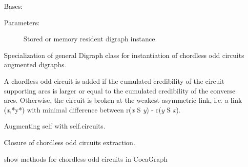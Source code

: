 \documentclass[letterpaper,10pt,english]{sphinxmanual}
\begin{document}
\begin{fulllineitems}
\label{techDoc:digraphs.CocaDigraph}
Bases: {\hyperref[techDoc:digraphs.Digraph]{\emph{}}}
\begin{description}
\item[{Parameters:}] \leavevmode
Stored or memory resident digraph instance.

\end{description}

Specialization of general Digraph class for instantiation
of chordless odd circuits augmented digraphs.

A chordless odd circuit is added if the cumulated credibility of the circuit supporting arcs is larger or
equal to the cumulated credibility of the converse arcs. Otherwise, the circuit is broken at the weakest asymmetric link,
i.e. a link (\emph{x},*y*) with minimal difference between r(\emph{x} S \emph{y}) - r(\emph{y} S \emph{x}).

\begin{fulllineitems}
\label{techDoc:digraphs.CocaDigraph.addCircuits}
Augmenting self with self.circuits.

\end{fulllineitems}


\begin{fulllineitems}
\label{techDoc:digraphs.CocaDigraph.closureChordlessOddCircuits}
Closure of chordless odd circuits extraction.

\end{fulllineitems}


\begin{fulllineitems}
\label{techDoc:digraphs.CocaDigraph.showCircuits}
show methods for chordless odd circuits in CocaGraph

\end{fulllineitems}


\begin{fulllineitems}
\label{techDoc:digraphs.CocaDigraph.showComponents}
\end{fulllineitems}


\end{fulllineitems}
\end{document}
